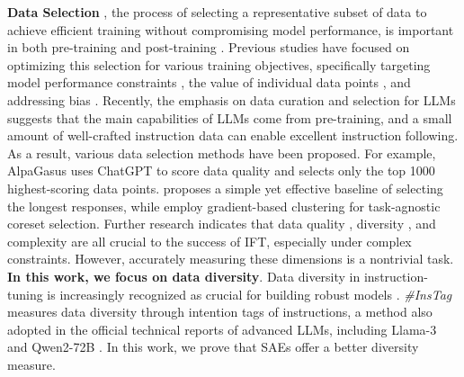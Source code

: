 \textbf{Data Selection} \citep{albalak2024survey, wang2024survey}, the process of selecting a representative subset of data to achieve efficient training without compromising model performance, is important in both pre-training \citep{brandfonbrener2024color, tirumala2023d4} and post-training \citep{chenalpagasus, li2024superfiltering}.
Previous studies \citep{mindermann2022prioritized, paul2021deep} have focused on optimizing this selection for various training objectives, specifically targeting model performance constraints \citep{xia2024refined}, the value of individual data points \citep{covertscaling}, and addressing bias \citep{jain2024data}.
Recently, the emphasis on data curation \citep{taori2023stanford, chiang2023vicuna, cui2024ultrafeedback, wang2023self} and selection \citep{zhou2024lima} for LLMs suggests that the main capabilities of LLMs come from pre-training, and a small amount of well-crafted instruction data can enable excellent instruction following.
As a result, various data selection methods \citep{du2023mods, chen2023maybe, xia2024rethinking, ge2024clustering, lee2024concept, liu2024selectit} have been proposed. For example, AlpaGasus \citep{chenalpagasus} uses ChatGPT to score data quality and selects only the top 1000 highest-scoring data points. \cite{zhaolong} proposes a simple yet effective baseline of selecting the longest responses, while \cite{xialess, zhang2024tagcos, pan2024g} employ gradient-based clustering for task-agnostic coreset selection.
Further research \citep{liumakes} indicates that data quality \citep{li2024quantity, ding2023enhancing, li2024selective, li2023reflection}, diversity \citep{ge2024clustering}, and complexity \citep{xu2023wizardlm, sun2024conifer, ivison2023camels} are all crucial to the success of IFT, especially under complex constraints. However, accurately measuring these dimensions is a nontrivial task.
\textbf{In this work, we focus on data diversity}. Data diversity in instruction-tuning is increasingly recognized as crucial for building robust models \citep{bukharin2023data}. \textit{\#InsTag} \citep{lu2023instag} measures data diversity through intention tags of instructions, a method also adopted in the official technical reports of advanced LLMs, including Llama-3 \citep{dubey2024llama} and Qwen2-72B \citep{bai2023qwen, yang2024qwen2}. In this work, we prove that SAEs offer a better diversity measure.
 
